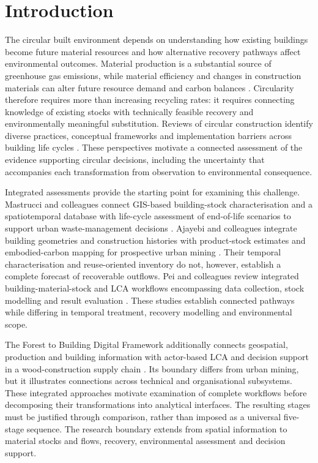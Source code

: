 \section{Introduction}
The circular built environment depends on understanding how existing buildings become future material resources and how alternative recovery pathways affect environmental outcomes. Material production is a substantial source of greenhouse gas emissions, while material efficiency and changes in construction materials can alter future resource demand and carbon balances \citep{I01,I02,I03}. Circularity therefore requires more than increasing recycling rates: it requires connecting knowledge of existing stocks with technically feasible recovery and environmentally meaningful substitution. Reviews of circular construction identify diverse practices, conceptual frameworks and implementation barriers across building life cycles \citep{I04,I05,I06,I07}. These perspectives motivate a connected assessment of the evidence supporting circular decisions, including the uncertainty that accompanies each transformation from observation to environmental consequence.

Integrated assessments provide the starting point for examining this challenge. Mastrucci and colleagues connect GIS-based building-stock characterisation and a spatiotemporal database with life-cycle assessment of end-of-life scenarios to support urban waste-management decisions \citep{I36}. Ajayebi and colleagues integrate building geometries and construction histories with product-stock estimates and embodied-carbon mapping for prospective urban mining \citep{I37}. Their temporal characterisation and reuse-oriented inventory do not, however, establish a complete forecast of recoverable outflows. Pei and colleagues review integrated building-material-stock and LCA workflows encompassing data collection, stock modelling and result evaluation \citep{I35}. These studies establish connected pathways while differing in temporal treatment, recovery modelling and environmental scope.

The Forest to Building Digital Framework additionally connects geospatial, production and building information with actor-based LCA and decision support in a wood-construction supply chain \citep{I38}. Its boundary differs from urban mining, but it illustrates connections across technical and organisational subsystems. These integrated approaches motivate examination of complete workflows before decomposing their transformations into analytical interfaces. The resulting stages must be justified through comparison, rather than imposed as a universal five-stage sequence. The research boundary extends from spatial information to material stocks and flows, recovery, environmental assessment and decision support.

